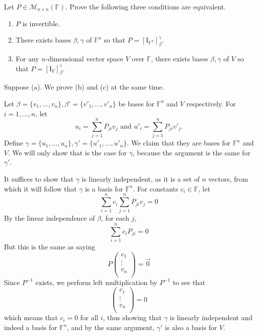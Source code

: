 \documentclass{eh-homework}
\begin{document}
    \newpage
    \begin{question}{8}
        Let \( P \in \mathcal{M}_{n \times n}(\mathbb{F}) \). Prove the following three conditions are equivalent.

        \begin{enumerate}[label=(\alph*)]
            \item \( P \) is invertible.
            \item There exists bases \( \beta, \gamma \) of \( \mathbb{F}^n \) so that \( P = [\mathrm{I}_{\mathbb{F}^n}]_\beta^\gamma \).
            \item For any \( n \)-dimensional vector space \( V \) over \( \mathbb{F} \), there exists bases \( \beta, \gamma \) of \( V \) so that \( P = [\mathrm{I}_V]_\beta^\gamma \).
        \end{enumerate}
        \tcblower

        Suppose (a). We prove (b) and (c) at the same time.

        Let \(\beta = \{ v_1, ..., v_n \}, \beta' = \{ v'_1, ..., v'_n \}\) be bases for \(\mathbb{F}^n\) and \(V\) respectively. For \(i = 1, ..., n\), let
        \[
            u_i = \sum_{j=1}^{n} P_{ji} v_j \text{ and } u'_i = \sum_{j=1}^{n} P_{ji} v'_j.
        \]
        Define \(\gamma = \{ u_1, ...,u_n \}, \gamma ' = \{ u'_1, ..., u'_n \}\). We claim that they are bases for \(\mathbb{F}^n\) and \(V\). We will only show that is the case for \(\gamma\), because the argument is the same for \(\gamma '\).

        It suffices to show that \(\gamma\) is linearly independent, as it is a set of \(n\) vectors, from which it will follow that \(\gamma\) is a basis for \(\mathbb{F}^n\). For constants \(c_i \in \mathbb{F}\), let
        \[
            \sum_{i=1}^{n} c_i \sum_{j=1}^{n} P_{ji} v_j = 0
        \]
        By the linear independence of \(\beta\), for each \(j\),
        \[
            \sum_{i=1}^{n} c_i P_{ji} = 0
        \]
        But this is the same as saying
        \[
            P \begin{pmatrix}
                 c_1 \\
                 \vdots \\
                 c_n \\
            \end{pmatrix}
            = \vec{0}
        \]
        Since \(P^{-1}\) exists, we perform left multiplication by \(P^{-1}\) to see that
        \[
            \begin{pmatrix}
                c_1 \\
                \vdots \\
                c_n \\
           \end{pmatrix} = 0
        \]
        which means that \(c_i = 0\) for all \(i\), thus showing that \(\gamma\) is linearly independent and indeed a basis for \(\mathbb{F}^n\), and by the same argument, \(\gamma'\) is also a basis for \(V\).


\end{question}
\end{document}
